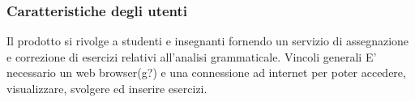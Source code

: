 \subsubsection{Caratteristiche degli utenti}
Il prodotto si rivolge a studenti e insegnanti fornendo un servizio di assegnazione e correzione di esercizi relativi all’analisi grammaticale.  
Vincoli generali
E’ necessario un web browser(g?) e una connessione ad internet per poter accedere, visualizzare, svolgere ed inserire esercizi.

